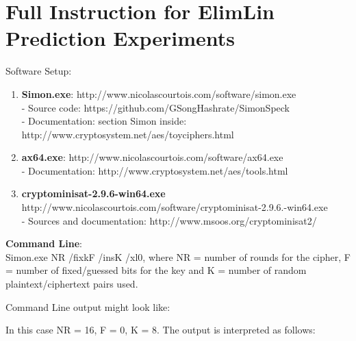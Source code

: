 
\appendix
\chapter{Full Instruction for ElimLin Prediction Experiments}
\label{appendixlabel1}

Software Setup:
\begin{enumerate}
	\item \textbf{Simon.exe}: http://www.nicolascourtois.com/software/simon.exe \\ 
	- Source code: https://github.com/GSongHashrate/SimonSpeck \\
	- Documentation: section Simon inside: http://www.cryptosystem.net/aes/toyciphers.html
	\item \textbf{ax64.exe}:  http://www.nicolascourtois.com/software/ax64.exe \\
	- Documentation: http://www.cryptosystem.net/aes/tools.html
	\item \textbf{cryptominisat-2.9.6-win64.exe} http://www.nicolascourtois.com/software/cryptominisat-2.9.6.-win64.exe \\
	-  Sources and documentation: http://www.msoos.org/cryptominisat2/
\end{enumerate}

\textbf{Command Line}:\\
Simon.exe NR /fixkF /insK /xl0, where NR = number of rounds for the cipher, F = number of fixed/guessed bits for the key and K = number of random plaintext/ciphertext pairs used.

Command Line output might look like: \\
\noindent{}

In this case NR = 16, F = 0, K = 8. The output is interpreted as follows:\\
\noindent{}

